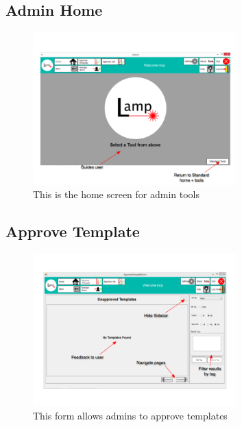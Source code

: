 \documentclass[oneside,openany,11pt,a4paper]{report}
\begin{document}
\subsection{Admin Home}
\begin{figure}[H]
	\centering
	\includegraphics[width=0.7\textwidth]{screen/adminhome.png}
	\caption{This is the home screen for admin tools}
\end{figure}


\subsection{Approve Template}
\begin{figure}[H]
	\centering
	\includegraphics[width=0.7\textwidth]{screen/approvetemplate.png}
	\caption{This form allows admins to approve templates}
\end{figure}
\end{document}
